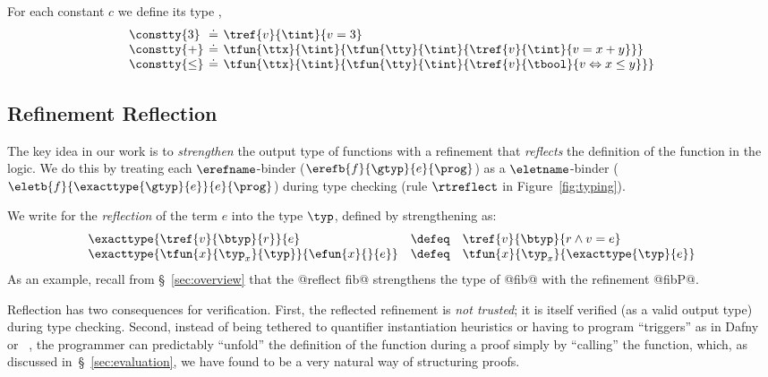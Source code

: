 For each constant $c$ we define its type , \eg%
%
$$
\setlength\arraycolsep{2pt}
\begin{array}{lcl}
\constty{3} &\doteq& \tref{v}{\tint}{v = 3}\\
\constty{+} &\doteq& \tfun{\ttx}{\tint}{\tfun{\tty}{\tint}{\tref{v}{\tint}{v = x + y}}}\\
\constty{\leq} &\doteq& \tfun{\ttx}{\tint}{\tfun{\tty}{\tint}{\tref{v}{\tbool}{v \Leftrightarrow x \leq y}}}\\
\end{array}
$$
%

\subsection{Refinement Reflection}\label{subsec:logicalannotations}
%
The key idea in our work is to
\emph{strengthen} the output type of functions
with a refinement that \emph{reflects} the
definition of the function in the logic.
%
We do this by treating each
%
$\erefname$-binder
%
(${\erefb{f}{\gtyp}{e}{\prog}}$)
%
as a $\eletname$-binder
%
(${\eletb{f}{\exacttype{\gtyp}{e}}{e}{\prog}}$)
%
during type checking (rule $\rtreflect$ in Figure~\ref{fig:typing}).

%
We write  for the \emph{reflection}
of the term $e$ into the type $\typ$,  defined by strengthening
\typ as:
%
$$
\begin{array}{lcl}
\exacttype{\tref{v}{\btyp}{r}}{e}
  & \defeq
  & \tref{v}{\btyp}{r \land v = e}\\
\exacttype{\tfun{x}{\typ_x}{\typ}}{\efun{x}{}{e}}
  & \defeq
  & \tfun{x}{\typ_x}{\exacttype{\typ}{e}}
\end{array}
$$
%
As an example, recall from \S~\ref{sec:overview}
that the @reflect fib@ strengthens the type of
@fib@ with the refinement @fibP@.


%
Reflection has two consequences for verification.
%
First, the reflected refinement is \emph{not trusted};
it is itself verified (as a valid output type)
during type checking.
%
Second, instead of being tethered to quantifier
instantiation heuristics or having to program
``triggers'' as in Dafny~\citep{dafny} or
\fstar~\citep{fstar},
%
the programmer can predictably ``unfold'' the
definition of the function during a proof simply
by ``calling'' the function, which, as discussed
in~\S~\ref{sec:evaluation}, we have found to be
a very natural way of structuring proofs.


